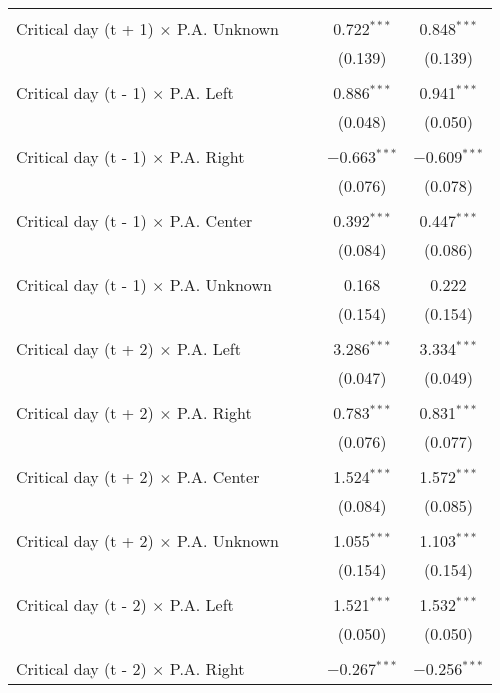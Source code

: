 \documentclass[
]{article}
\begin{document}
\begin{table}[!htbp]
{\begin{tabular}{@{\extracolsep{5pt}}lcccc}
  & & & & \\ 
 Critical day (t + 1) $\times$ P.A. Unknown &  &  & 0.722$^{***}$ & 0.848$^{***}$ \\ 
  &  &  & (0.139) & (0.139) \\ 
  & & & & \\ 
 Critical day (t - 1) $\times$ P.A. Left &  &  & 0.886$^{***}$ & 0.941$^{***}$ \\ 
  &  &  & (0.048) & (0.050) \\ 
  & & & & \\ 
 Critical day (t - 1) $\times$ P.A. Right &  &  & $-$0.663$^{***}$ & $-$0.609$^{***}$ \\ 
  &  &  & (0.076) & (0.078) \\ 
  & & & & \\ 
 Critical day (t - 1) $\times$ P.A. Center &  &  & 0.392$^{***}$ & 0.447$^{***}$ \\ 
  &  &  & (0.084) & (0.086) \\ 
  & & & & \\ 
 Critical day (t - 1) $\times$ P.A. Unknown &  &  & 0.168 & 0.222 \\ 
  &  &  & (0.154) & (0.154) \\ 
  & & & & \\ 
 Critical day (t + 2) $\times$ P.A. Left &  &  & 3.286$^{***}$ & 3.334$^{***}$ \\ 
  &  &  & (0.047) & (0.049) \\ 
  & & & & \\ 
 Critical day (t + 2) $\times$ P.A. Right &  &  & 0.783$^{***}$ & 0.831$^{***}$ \\ 
  &  &  & (0.076) & (0.077) \\ 
  & & & & \\ 
 Critical day (t + 2) $\times$ P.A. Center &  &  & 1.524$^{***}$ & 1.572$^{***}$ \\ 
  &  &  & (0.084) & (0.085) \\ 
  & & & & \\ 
 Critical day (t + 2) $\times$ P.A. Unknown &  &  & 1.055$^{***}$ & 1.103$^{***}$ \\ 
  &  &  & (0.154) & (0.154) \\ 
  & & & & \\ 
 Critical day (t - 2) $\times$ P.A. Left &  &  & 1.521$^{***}$ & 1.532$^{***}$ \\ 
  &  &  & (0.050) & (0.050) \\ 
  & & & & \\ 
 Critical day (t - 2) $\times$ P.A. Right &  &  & $-$0.267$^{***}$ & $-$0.256$^{***}$ \\ 

\end{tabular}}
\end{table}
\end{document}
